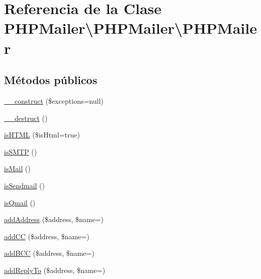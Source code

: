 \hypertarget{classPHPMailer_1_1PHPMailer_1_1PHPMailer}{}\section{Referencia de la Clase P\+H\+P\+Mailer\textbackslash{}P\+H\+P\+Mailer\textbackslash{}P\+H\+P\+Mailer}
\label{classPHPMailer_1_1PHPMailer_1_1PHPMailer}
\subsection*{Métodos públicos}
\begin{DoxyCompactItemize}
\item 
\hyperlink{classPHPMailer_1_1PHPMailer_1_1PHPMailer_a29c8ddd01ae18fa75d02e14005efce22}{\+\_\+\+\_\+construct} (\$exceptions=null)
\item 
\hyperlink{classPHPMailer_1_1PHPMailer_1_1PHPMailer_ae6d9332d9dab73c4745740248e117023}{\+\_\+\+\_\+destruct} ()
\item 
\hyperlink{classPHPMailer_1_1PHPMailer_1_1PHPMailer_aedd9844698b991335735d31ca6b634e6}{is\+H\+T\+ML} (\$is\+Html=true)
\item 
\hyperlink{classPHPMailer_1_1PHPMailer_1_1PHPMailer_ade9300b24162e685f7b3bb27d77ce523}{is\+S\+M\+TP} ()
\item 
\hyperlink{classPHPMailer_1_1PHPMailer_1_1PHPMailer_abf1825344fbbb71223ffd0a1cf069c6a}{is\+Mail} ()
\item 
\hyperlink{classPHPMailer_1_1PHPMailer_1_1PHPMailer_a21b42f88f6fa9ca1866c5810a03e780c}{is\+Sendmail} ()
\item 
\hyperlink{classPHPMailer_1_1PHPMailer_1_1PHPMailer_a97b8e092331ece317fbf9f54aa5f4a26}{is\+Qmail} ()
\item 
\hyperlink{classPHPMailer_1_1PHPMailer_1_1PHPMailer_a50457698c839c62db6fdb842aaad0371}{add\+Address} (\$address, \$name=\textquotesingle{}\textquotesingle{})
\item 
\hyperlink{classPHPMailer_1_1PHPMailer_1_1PHPMailer_a2437fcf72726c5bc805a6ea834da7aeb}{add\+CC} (\$address, \$name=\textquotesingle{}\textquotesingle{})
\item 
\hyperlink{classPHPMailer_1_1PHPMailer_1_1PHPMailer_a6d8e4f0c525e8826c0be498fd42dc990}{add\+B\+CC} (\$address, \$name=\textquotesingle{}\textquotesingle{})
\item 
\hyperlink{classPHPMailer_1_1PHPMailer_1_1PHPMailer_a03b9a0738fa3dd153e150fd8c8347981}{add\+Reply\+To} (\$address, \$name=\textquotesingle{}\textquotesingle{})

\end{DoxyCompactItemize}
